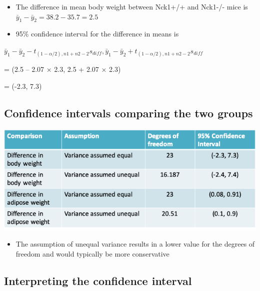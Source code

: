 \documentclass[
]{book}
\providecommand{\tightlist}{%
  \setlength{\itemsep}{0pt}\setlength{\parskip}{0pt}}
\begin{document}
\begin{itemize}
\tightlist
\item
  The difference in mean body weight between Nck1+/+ and Nck1-/- mice is \(\bar y_1-\bar y_2=38.2-35.7=2.5\)
\item
  95\% confidence interval for the difference in means is
\end{itemize}

\(\bar y_1-\bar y_2-t_{(1-\alpha/2),n1+n2-2}s_{diff},\bar y_1-\bar y_2+t_{(1-\alpha/2),n1+n2-2}s_{diff}\)

= (2.5 -- 2.07 × 2.3, 2.5 + 2.07 × 2.3)

= (-2.3, 7.3)

\hypertarget{confidence-intervals-comparing-the-two-groups}{%
\subsection{Confidence intervals comparing the two groups}\label{confidence-intervals-comparing-the-two-groups}}

\includegraphics[width=1\linewidth]{./3_62}

\begin{itemize}
\tightlist
\item
  The assumption of unequal variance results in a lower value for the degrees of freedom and would typically be more conservative
\end{itemize}

\hypertarget{interpreting-the-confidence-interval-1}{%
\subsection{Interpreting the confidence interval}\label{interpreting-the-confidence-interval-1}}
\end{document}
